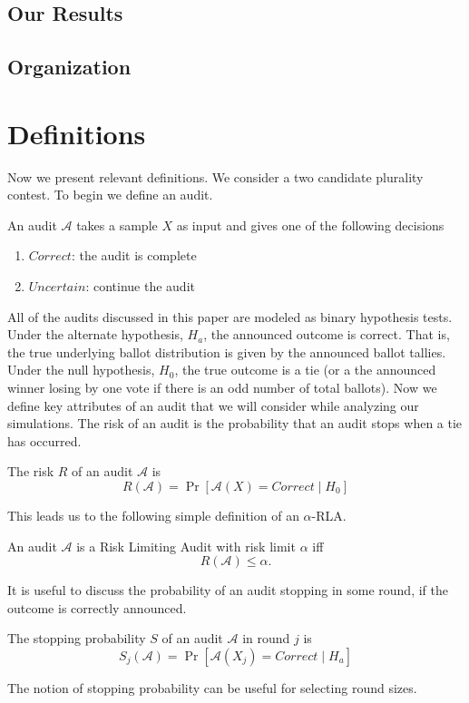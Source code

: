 \documentclass[runningheads]{llncs}
\begin{document}
\subsection{Our Results}

\subsection{Organization}

\section{Definitions}
Now we present relevant definitions.
We consider a two candidate plurality contest.
To begin we define an audit.
\begin{definition}
An audit $\mathcal{A}$ takes a sample $X$ as input and gives one of the 
following decisions
\begin{enumerate}
\item
$Correct$: the audit is complete
\item
$Uncertain$: continue the audit
\end{enumerate}
\end{definition}
All of the audits discussed in this paper are modeled as binary hypothesis tests.
Under the alternate hypothesis, $H_a$, the announced outcome is correct. 
That is, the true underlying ballot distribution is given by the announced ballot tallies.
Under the null hypothesis, $H_0$, the true outcome is a tie 
(or a the announced winner losing by one vote if there is an odd number of total ballots).
Now we define key attributes of an audit that we will consider while analyzing our simulations.
The risk of an audit is the probability that an audit stops when a tie has occurred.
\begin{definition}[Risk]
The risk $R$ of an audit $\mathcal{A}$ is
$$R(\mathcal{A})=\Pr[\mathcal{A}(X)=Correct \mid H_0]$$
\end{definition}
This leads us to the following simple definition of an $\alpha$-RLA.
\begin{definition}
An audit $\mathcal{A}$ is a Risk Limiting Audit with 
risk limit $\alpha$ iff 
$$R(\mathcal{A}) \le \alpha.$$
\end{definition}

It is useful to discuss the probability of an audit stopping in
some round, if the outcome is correctly announced.
\begin{definition}
The stopping probability $S$ of an audit $\mathcal{A}$ in round $j$ is 
$$S_j(\mathcal{A})=\Pr[\mathcal{A}(X_j)=Correct \mid H_a]$$
\end{definition}
The notion of stopping probability can be useful for selecting round sizes.
\end{document}
